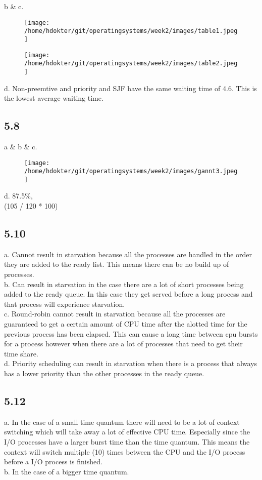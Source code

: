 \documentclass[]{article}
\begin{document}
b \& c.
  
\begin{figure}[H]
  \texttt{[image: /home/hdokter/git/operatingsystems/week2/images/table1.jpeg]}
\end{figure}

\begin{figure}[H]
  \texttt{[image: /home/hdokter/git/operatingsystems/week2/images/table2.jpeg]}
\end{figure}

d. Non-preemtive and priority and SJF have the same waiting time of 4.6. This is the lowest average waiting time.

\subsection*{5.8}

a \& b \& c.
\begin{figure}[H]
  \texttt{[image: /home/hdokter/git/operatingsystems/week2/images/gannt3.jpeg]}
\end{figure}

d. 87.5\%,\\ (105 / 120 * 100)

\subsection*{5.10}

a. Cannot result in starvation because all the processes are handled in the order they are added to the ready list. This means there can be no build up of processes.\\
b. Can result in starvation in the case there are a lot of short processes being added to the ready queue. In this case they get served before a long process and that process will experience starvation.\\
c. Round-robin cannot result in starvation because all the processes are guaranteed to get a certain amount of CPU time after the alotted time for the previous process has been elapsed. This can cause a long time between cpu bursts for a process however when there are a lot of processes that need to get their time share.\\
d. Priority scheduling can result in starvation when there is a process that always has a lower priority than the other processes in the ready queue.\\

\subsection*{5.12}

a. In the case of a small time quantum there will need to be a lot of context switching which will take away a lot of effective CPU time. Especially since the I/O processes have a larger burst time than the time quantum. This means the context will switch multiple (10) times between the CPU and the I/O process before a I/O process is finished.\\
b. In the case of a bigger time quantum.\\
\end{document}
